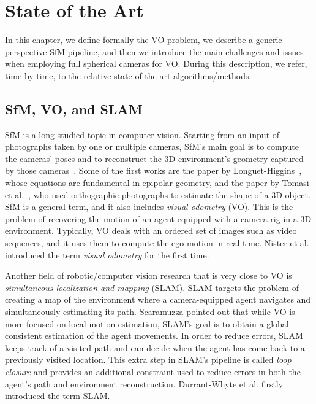 \chapter{State of the Art}
\label{ch:state_of_the_art}
%
In this chapter, we define formally the VO problem, we describe a generic perspective SfM pipeline, 
and then we introduce the main challenges and issues when employing full spherical cameras for VO.
During this description, we refer, time by time, to the relative state of the art algorithms/methods.

%

\section{SfM, VO, and SLAM}
SfM is a long-studied topic in computer vision. Starting from an input of photographs taken by one or multiple cameras, SfM's main goal is to compute the cameras' poses and to reconstruct the 3D environment's geometry captured by those cameras~\cite{szeliski2010computer}.
%
Some of the first works are the paper by Longuet-Higgins~\cite{longuet1981computer}, whose equations are fundamental in epipolar geometry, and the paper by Tomasi et al.~\cite{tomasi1992shape}, who used orthographic photographs to estimate the shape of a 3D object.
%
SfM is a general term, and it also includes \textit{visual odometry} (VO). This is the problem of recovering the motion of an agent equipped with a camera rig in a 3D environment. Typically, VO deals with an ordered set of images such as video sequences, and it uses them to compute the ego-motion in real-time. Nister et al.\cite{nister2004visual} introduced the term \textit{visual odometry} for the first time.

Another field of robotic/computer vision research that is very close to VO is \textit{simultaneous localization and mapping} (SLAM). SLAM targets the problem of creating a map of the environment where a camera-equipped agent navigates and simultaneously estimating its path. Scaramuzza\cite{scaramuzzaVisualOdometryI} pointed out that while VO is more focused on local motion estimation, SLAM's goal is to obtain a global consistent estimation of the agent movements.
%
In order to reduce errors, SLAM keeps track of a visited path and can decide when the agent has come back to a previously visited location. This extra step in SLAM's pipeline is called \textit{loop closure} and provides an additional constraint used to reduce errors in both the agent's path and 
environment reconstruction. Durrant-Whyte et al.\cite{durrant1996localization} firstly introduced the term SLAM.
 
